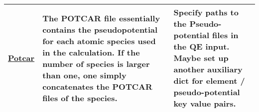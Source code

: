 \documentclass[12pt]{article}
\begin{document}
\begin{center}
\begin{table}[ht]
\begin{tabularx}{\linewidth}{|>{\RaggedRight}p{2.5cm}|x|x|}
 \href{https://www.vasp.at/wiki/index.php/POTCAR}{Potcar} &
 The POTCAR file essentially contains the pseudopotential for each atomic species used in the calculation. If the number of species is larger than one, one simply concatenates the POTCAR files of the species. &
 Specify paths to the Pseudo-potential files in the QE input. Maybe set up another auxiliary dict for element / pseudo-potential key value pairs.   \\ \hline
\end{tabularx}
\end{table}
\end{center}
\end{document}
